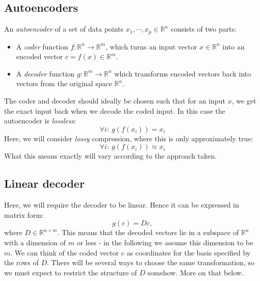 \documentclass[12pt, a4paper]{article}
\numberwithin{equation}{section}
\begin{document}
\subsection{Autoencoders}
An \textit{autoencoder} of a set of data points $x_1,\cdots, x_p\in\mathbb{R}^n$ consists of two parts:
\begin{itemize}
\item A \textit{coder} function $f: \mathbb{R}^n\rightarrow\mathbb{R}^m$, which turns an input vector $x\in\mathbb{R}^n$ into an encoded vector $c=f(x)\in\mathbb{R}^m$.
\item A \textit{decoder} function $g: \mathbb{R}^m\rightarrow\mathbb{R}^n$ which transforms encoded vectors back into vectors from the original space $\mathbb{R}^n$.
\end{itemize}
The coder and decoder should ideally be chosen such that for an input $x$, we get the exact input back when we decode the coded input. In this case the autoencoder is \textit{lossless}:
\begin{equation}
\forall i:\ g(f(x_i))=x_i
\end{equation}
Here, we will consider \textit{lossy} compression, where this is only approximately true:
\begin{equation}
\forall i:\ g(f(x_i))\approx x_i
\end{equation} 
What this means exactly will vary according to the approach taken.

\subsection{Linear decoder}
Here, we will require the decoder to be linear. Hence it can be expressed in matrix form:
\begin{equation}
g(c)=Dc,
\end{equation}
where $D\in\mathbb{R}^{n\times m}$. This means that the decoded vectors lie in a subspace of $\mathbb{R}^n$ with a dimension of $m$ or less - in the following we assume this dimension to be $m$. We can think of the coded vector $c$ as coordinates for the basis specified by the rows of $D$. There will be several ways to choose the same transformation, so we must expect to restrict the structure of $D$ somehow. More on that below.
\end{document}
